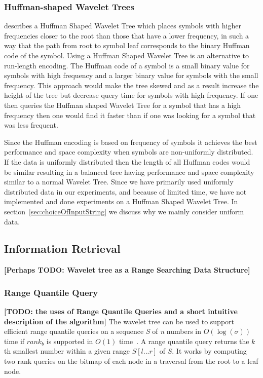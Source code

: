 \subsubsection{Huffman-shaped Wavelet Trees}
\citep[Section~4]{FMcountOnBWT} describes a Huffman Shaped Wavelet Tree which places symbols with higher frequencies closer to the root than those that have a lower frequency, in such a way that the path from root to symbol leaf corresponds to the binary Huffman code of the symbol. Using a Huffman Shaped Wavelet Tree is an alternative to run-length encoding.
The Huffman code of a symbol is a small binary value for symbols with high frequency and a larger binary value for symbols with the small frequency.
This approach would make the tree skewed and as a result increase the height of the tree but decrease query time for symbols with high frequency.
If one then queries the Huffman shaped Wavelet Tree for a symbol that has a high frequency then one would find it faster than if one was looking for a symbol that was less frequent.

Since the Huffman encoding is based on frequency of symbols it achieves the best performance and space complexity when symbols are non-uniformly distributed.
If the data is uniformly distributed then the length of all Huffman codes would be similar resulting in a balanced tree having performance and space complexity similar to a normal Wavelet Tree.
Since we have primarily used uniformly distributed data in our experiments, and because of limited time, we have not implemented and done experiments on a Huffman Shaped Wavelet Tree.
In section~\ref{sec:choiceOfInputString} we discuss why we mainly consider uniform data.


\subsection{Information Retrieval}
\textbf{[Perhaps TODO: Wavelet tree as a Range Searching Data Structure]}


\subsubsection{Range Quantile Query}
\textbf{[TODO: the uses of Range Quantile Queries and a short intuitive description of the algorithm]}
The wavelet tree can be used to support efficient range quantile queries on a sequence \textit{S} of \textit{n} numbers in $O(\log(\sigma))$ time if $rank_b$ is supported in $O(1)$ time~\citep[Section~3]{RangeQuantileQueryWT}. 
A range quantile query returns the $k$th smallest number within a given range $S[l ... r]$ of $S$.
It works by computing two rank queries on the bitmap of each node in a traversal from the root to a leaf node. 


